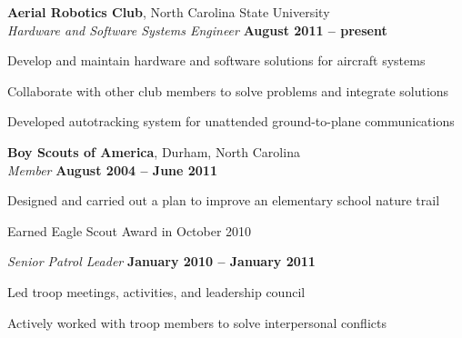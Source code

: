 \documentclass[margin,line,letterpaper]{resume}
\begin{document}
\begin{resume}
    \textbf{Aerial Robotics Club}, North Carolina State University \vspace{2mm}\\\vspace{1mm}%
    \textsl{Hardware and Software Systems Engineer} \hfill \textbf{August 2011 -- present}\vspace{-3mm}\\\vspace{-1mm}%
    \begin{list2}
    \item Develop and maintain hardware and software solutions for aircraft systems
    \item Collaborate with other club members to solve problems and integrate solutions
    \item Developed autotracking system for unattended ground-to-plane communications
    \end{list2}\vspace{-1.5mm}

    \textbf{Boy Scouts of America}, Durham, North Carolina \vspace{2mm}\\\vspace{1mm}%
    \textsl{Member} \hfill \textbf{August 2004 -- June 2011}\vspace{-3mm}\\\vspace{-1mm}%
    \begin{list2}
    \item Designed and carried out a plan to improve an elementary school nature trail
    \item Earned Eagle Scout Award in October 2010
    \end{list2}\vspace{-1.5mm}

    \textsl{Senior Patrol Leader} \hfill \textbf{January 2010 -- January 2011}\vspace{-3mm}\\\vspace{-1mm}%
    \begin{list2}
    \item Led troop meetings, activities, and leadership council
    \item Actively worked with troop members to solve interpersonal conflicts
    \end{list2}\vspace{-1.5mm}



\end{resume}
\end{document}
